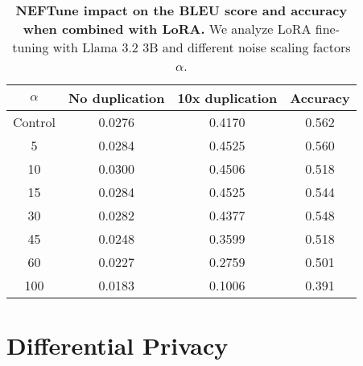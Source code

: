 \begin{table}[ht]
\caption{\textbf{NEFTune impact on the BLEU score and accuracy when combined with LoRA.} We analyze LoRA fine-tuning with Llama 3.2 3B and different noise scaling factors $\alpha$.}
\label{tab:neftune}
\vskip 0.15in
\begin{center}
\begin{scriptsize}
\begin{tabular}{@{}c|ccc@{}}
\toprule
$\alpha$ & No duplication & 10x duplication & Accuracy       \\ \midrule
Control     & 0.0276           & 0.4170           & 0.562 \\
5           & 0.0284           & 0.4525           & 0.560 \\
10          & 0.0300           & 0.4506           & 0.518 \\
15          & 0.0284           & 0.4525           & 0.544 \\
30          & 0.0282           & 0.4377           & 0.548 \\
45          & 0.0248           & 0.3599           & 0.518 \\
60          & 0.0227           & 0.2759           & 0.501 \\
100         & 0.0183           & 0.1006           & 0.391 \\ 
\bottomrule
\end{tabular}
\end{scriptsize}
\end{center}
\vskip -0.1in
\end{table}

\section{Differential Privacy}
\label{sec:dp}

